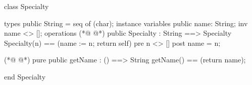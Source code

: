\begin{vdmpp}[breaklines=true]
class Specialty

types
 public String = seq of (char);
instance variables
  public name: String;
  inv name <> [];
operations
(*@
\label{Specialty:9}
@*)
 public Specialty : String ==> Specialty
  Specialty(n) == (name := n; return self)
 pre n <> []
 post name = n;
  
(*@
\label{getName:14}
@*)
 pure public getName : () ==> String
  getName() == (return name);

end Specialty
\end{vdmpp}
